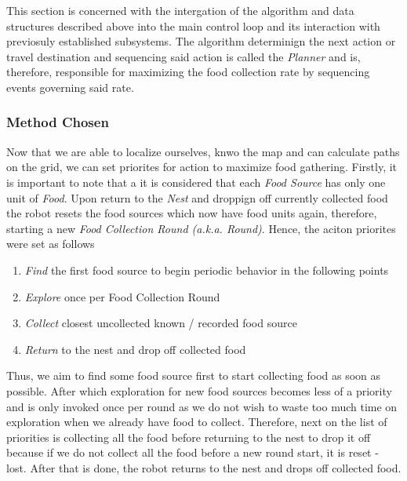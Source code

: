 \documentclass[11pt, a4paper]{article}
\begin{document}
This section is concerned with the intergation of the algorithm and data structures described above into the main control loop and its interaction with previosuly established subsystems\cite{task2_report}. The algorithm determinign the next action or travel destination and sequencing said action is called the \textit{Planner} and is, therefore, responsible for maximizing the food collection rate by sequencing events governing said rate.

\subsubsection{Method Chosen}
\label{Planner_Principle}

Now that we are able to localize ourselves, knwo the map and can calculate paths on the grid, we can set priorites for action to maximize food gathering. Firstly, it is important to note that a it is considered that each \textit{Food Source} has only one unit of \textit{Food}. Upon return to the \textit{Nest} and droppign off currently collected food the robot resets the food sources which now have food units again, therefore, starting a new \textit{Food Collection Round (a.k.a. Round)}. Hence, the aciton priorites were set as follows

\begin{enumerate}
	\item \textit{Find} the first food source to begin periodic behavior in the following points
	\item \textit{Explore} once per Food Collection Round
	\item \textit{Collect} closest uncollected known / recorded food source
	\item \textit{Return} to the nest and drop off collected food
\end{enumerate}

Thus, we aim to find some food source first to start collecting food as soon as possible. After which exploration for new food sources becomes less of a priority and is only invoked once per round as we do not wish to waste too much time on exploration when we already have food to collect. Therefore, next on the list of priorities is collecting all the food before returning to the nest to drop it off because if we do not collect all the food before a new round start, it is reset - lost. After that is done, the robot returns to the nest and drops off collected food.
\end{document}
